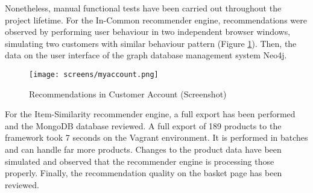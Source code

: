 Nonetheless, manual functional tests have been carried out throughout the project lifetime. For the In-Common recommender engine, recommendations were observed by performing user behaviour in two independent browser windows, simulating two customers with similar behaviour pattern (Figure \ref{fig:testing-magento-myaccount}). Then, the data on the user interface of the graph database management system Neo4j.

\begin{figure}[!ht]
    \texttt{[image: screens/myaccount.png]}
    \caption{Recommendations in Customer Account (Screenshot)}
    \label{fig:testing-magento-myaccount}
\end{figure}

For the Item-Similarity recommender engine, a full export has been performed and the MongoDB database reviewed. A full export of 189 products to the framework took 7 seconds on the Vagrant environment. It is performed in batches and can handle far more products. Changes to the product data have been simulated and observed that the recommender engine is processing those properly. Finally, the recommendation quality on the basket page has been reviewed.